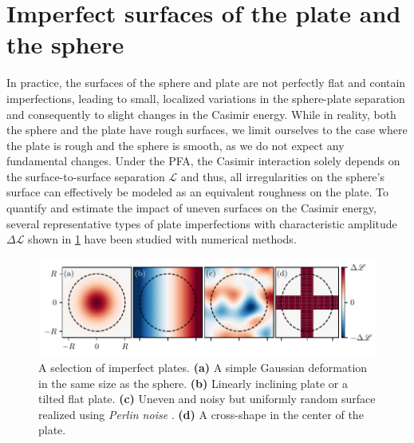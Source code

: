 \section{Imperfect surfaces of the plate and the sphere}
\label{sec:3:imperfect-plates}

In practice, the surfaces of the sphere and plate are not perfectly flat and contain imperfections, leading to small, localized variations in the sphere-plate separation and consequently to slight changes in the Casimir energy. 
While in reality, both the sphere and the plate have rough surfaces, we limit ourselves to the case where the plate is rough and the sphere is smooth, as we do not expect any fundamental changes.
Under the PFA, the Casimir interaction solely depends on the surface-to-surface separation $\mathscr{L}$ and thus, all irregularities on the sphere's surface can effectively be modeled as an equivalent roughness on the plate.
To quantify and estimate the impact of uneven surfaces on the Casimir energy, several representative types of plate imperfections with characteristic amplitude $\Delta \mathscr{L}$ shown in \cref{fig:3:imperfect-plates} have been studied with numerical methods.
\begin{figure}[!htbp]
  \centering
  \includegraphics[width=\textwidth]{../figures/casimir/imperfect-plates-advanced-colorbar.pdf}
  \caption{A selection of imperfect plates. \textbf{(a)} A simple Gaussian deformation in the same size as the sphere. \textbf{(b)} Linearly inclining plate or a tilted flat plate. \textbf{(c)} Uneven and noisy but uniformly random surface realized using \textit{Perlin noise} \cite{Perlin_1985}. \textbf{(d)} A cross-shape in the center of the plate.}
  \label{fig:3:imperfect-plates}
\end{figure}
